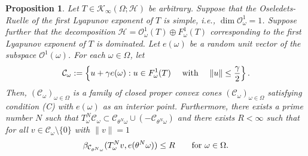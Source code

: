 \documentclass[pdflatex,sn-mathphys-num]{sn-jnl}%
\theoremstyle{thmstyleone}%
\newtheorem{proposition}[theorem]{Proposition}%
\theoremstyle{thmstyletwo}%
\theoremstyle{thmstylethree}%
\newcommand{\cH}{\mathcal{H}}
\newcommand{\cK}{\mathcal{K}}
\newcommand{\cC}{\mathcal{C}}
\newcommand{\cO}{\mathcal{O}}
\numberwithin{equation}{section}
\begin{document}
\begin{proposition}\label{firstproposition}
Let $T\in \cK_{\infty}(\Omega;\mathcal H)$ be arbitrary. Suppose that the Oseledets-Ruelle of the first Lyapunov exponent of $T$ is simple, i.e., $\dim \cO^1_{\omega}=1$. Suppose further that the decomposition $\cH= \mathcal O^1_{\omega}(T)\oplus F_{\omega}^1(T)$ corresponding to the first Lyapunov exponent of $T$ is dominated. Let $e(\omega)$ be a random unit vector of the subspace $\cO^1(\omega)$.    For each $\omega\in\Omega$, let \begin{equation}\label{Invariantcone_FirstLE}
    \cC_{\omega}:=\left\{ u+\gamma e(\omega): u\in F_{\omega}^1(T)\quad  \hbox{ with }\quad  \|u\|\leq \frac{\gamma}{2} \right\}.
    \end{equation}
Then, $(\mathcal C_{\omega})_{\omega\in\Omega}$ is a family of closed proper convex cones  $(\mathcal C_{\omega})_{\omega\in \Omega}$  satisfying condition (C) with $e(\omega)$ as an interior point. Furthermore, there exists a prime number $N$ such that $T^N_{\omega}\mathcal C_{\omega}\subset \mathcal C_{\theta^N \omega}\cup (-\mathcal C_{\theta^N\omega})$ and there exists $R<\infty$ such that for all $v\in  \mathcal C_{\omega}\setminus\{0\}$ with $\|v\|=1$
\begin{equation}\label{Interior_Aim}
\beta_{\mathcal C_{\theta^N\omega}}(T^N_{\omega}v, e(\theta^N\omega))\leq R\qquad\hbox{for } \omega\in \Omega.
\end{equation}

\end{proposition}
%
%
%
\end{document}
